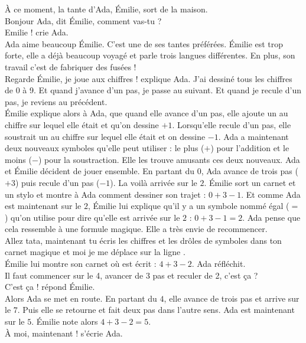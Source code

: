 À ce moment, la tante d'Ada, Émilie, sort de la maison. \\
\guillemotleft Bonjour Ada, dit Émilie, comment vas-tu ?\\
\mdash Emilie !  crie Ada. \guillemotright \\
Ada aime beaucoup Émilie. C’est une de ses tantes préférées. Émilie est trop forte, elle a déjà beaucoup voyagé et parle trois langues différentes. En plus, son travail c’est de fabriquer des fusées !\\
\guillemotleft Regarde Émilie, je joue aux chiffres ! explique Ada. J’ai dessiné tous les chiffres de 0 à 9. Et quand j’avance d’un pas, je passe au suivant. Et quand je recule d’un pas, je reviens au précédent. \guillemotright \\
Émilie explique alors à Ada, que quand elle avance d’un pas, elle ajoute un au chiffre sur lequel elle était et qu'on dessine $+1$. Lorsqu’elle recule d’un pas, elle soustrait un au chiffre sur lequel elle était et on dessine $-1$. Ada a maintenant deux nouveaux symboles qu’elle peut utiliser : le plus ($+$) pour l’addition et le moins ($-$) pour la soustraction. Elle les trouve amusants ces deux nouveaux. 
Ada et Émilie décident de jouer ensemble. En partant du $0$, Ada avance de trois pas ($+3$) puis recule d'un pas ($-1$). La voilà arrivée sur le $2$. Émilie sort un carnet et un stylo et montre à Ada comment dessiner son trajet : $0 + 3 - 1 $. Et comme Ada est maintenant sur le $2$, Émilie lui explique qu’il y a un symbole nommé égal ($=$) qu'on utilise pour dire qu’elle est arrivée sur le $2$ : $0 + 3 - 1 = 2$. Ada pense que cela ressemble à une formule magique. Elle a très envie de recommencer. \\
\guillemotleft Allez tata, maintenant tu écris les chiffres et les drôles de symboles dans ton carnet magique et moi je me déplace sur la ligne \guillemotright. \\
Émilie lui montre son carnet où est écrit : $4 + 3 - 2$. Ada réfléchit. \\
\guillemotleft Il faut commencer sur le 4, avancer de 3 pas et reculer de 2, c’est ça ? \\
\mdash C’est ça ! répond Émilie. \guillemotright \\
Alors Ada se met en route. En partant du $4$, elle avance de trois pas et arrive sur le $7$. Puis elle se retourne et fait deux pas dans l’autre sens. Ada est maintenant sur le $5$. Émilie note alors $4 + 3 - 2 = 5 $.\\
\guillemotleft À moi, maintenant ! s’écrie Ada. \guillemotright \\

